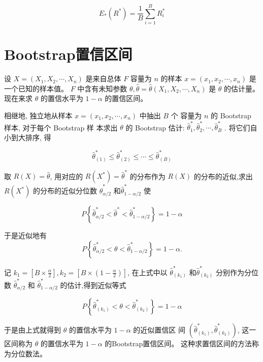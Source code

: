 $$ E_{*}\left(R^{*}\right)=\frac{1}{B} \sum_{i=1}^{B} R_{i}^{*} $$

\section{Bootstrap置信区间}

设 $ X=\left(X_{1}, X_{2}, \cdots, X_{n}\right) $ 是来自总体 $ F $ 容量为 $ n $ 的样本 $ {x}=\left({x}_{1}, {x}_{2}, \cdots, {x}_{n}\right) $ 是一个已知的样本值。  $ {F} $ 中含有未知参数 $ \theta, \hat{\theta}=\hat{\theta}\left(X_{1}, X_{2}, \cdots, X_{n}\right) $ 是 $ \theta $ 的估计量。 现在来求 $ \theta $ 的置信水平为 $ 1-\alpha $ 的置信区间。 

相继地, 独立地从样本 $ {x}=\left(x_{1}, x_{2}, \cdots, x_{n}\right) $ 中抽出 $ B $ 个 容量为 $ n $ 的 Bootstrap 样本, 对于每个 Bootstrap 样 本求出 $ \theta $ 的 Bootstrap 估计: $ \hat{\theta}_{1}^{*}, \hat{\theta}_{2}^{*}, \cdots, \hat{\theta}_{B}^{*} $ .  将它们自 小到大排序, 得

$$ \hat{\theta}_{(1)}^{*} \leq \hat{\theta}_{(2)}^{*} \leq \cdots \leq \hat{\theta}_{(B)}^{*} $$

取 $ R(X)=\hat{\theta} $, 用对应的 $ R\left(X^{*}\right)=\hat{\theta}^{*} $ 的分布作为 $ R(X) $ 的分布的近似,求出 $ R\left(X^{*}\right) $ 的分布的近似分位数 $ \hat{\theta}_{\alpha / 2}^{*} $ 和$ \hat{\theta}_{1-\alpha / 2}^{*} $ 使

$$ P\left\{\hat{\theta}_{\alpha / 2}^{*}<\hat{\theta}^{*}<\hat{\theta}_{1-\alpha / 2}^{*}\right\}=1-\alpha $$

于是近似地有
$$
P\left\{\hat{\theta}_{\alpha / 2}^{*}<\theta<\hat{\theta}_{1-\alpha / 2}^{*}\right\}=1-\alpha .
$$

记 $ {k}_{1}=\left[{B} \times \frac{\alpha}{{2}}\right], {k}_{2}=\left[{B} \times\left({1}-\frac{\alpha}{{2}}\right)\right] $, 在上式中以 $ \hat{\theta}_{\left(k_{1}\right)}^{*} $ 和$ \hat{\theta}_{\left(k_{2}\right)}^{*} $ 分别作为分位数 $ \hat{\theta}_{\alpha / 2}^{*} $ 和 $ \hat{\theta}_{1-\alpha / 2}^{*} $ 的估计,得到近似等式

$$ P\left\{\hat{\theta}_{\left(k_{1}\right)}^{*}<\theta<\hat{\theta}_{\left(k_{2}\right)}^{*}\right\}=1-\alpha $$

于是由上式就得到 $ \theta $ 的置信水平为 $ 1-\alpha $ 的近似置信区 间 $ \left(\hat{\theta}_{\left(k_{1}\right)}^{*}, \hat{\theta}_{\left(k_{2}\right)}^{*}\right) $, 这一区间称为 $ \theta $ 的置信水平为 $ 1-\alpha $ 的Bootstrap置信区间。 这种求置信区间的方法称为分位数法。 

